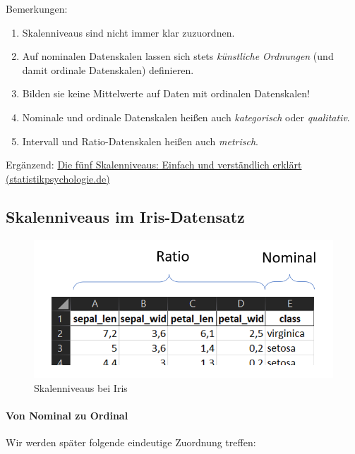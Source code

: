 \documentclass[
  oneside]{book}
\begin{document}
Bemerkungen:

\begin{enumerate}
\def\labelenumi{\arabic{enumi}.}
\item
  Skalenniveaus sind nicht immer klar zuzuordnen.
\item
  Auf nominalen Datenskalen lassen sich stets \emph{künstliche Ordnungen} (und damit ordinale Datenskalen) definieren.
\item
  Bilden sie keine Mittelwerte auf Daten mit ordinalen Datenskalen!
\item
  Nominale und ordinale Datenskalen heißen auch \emph{kategorisch} oder \emph{qualitativ}.
\item
  Intervall und Ratio-Datenskalen heißen auch \emph{metrisch}.
\end{enumerate}

Ergänzend: \href{https://www.statistikpsychologie.de/skalenniveaus/}{Die fünf Skalenniveaus: Einfach und verständlich erklärt (statistikpsychologie.de)}

\hypertarget{skalenniveaus-im-iris-datensatz}{%
\subsection{Skalenniveaus im Iris-Datensatz}\label{skalenniveaus-im-iris-datensatz}}

\begin{figure}
\centering
\includegraphics{assets/daten.assets/image-20211209145313372.png}
\caption{Skalenniveaus bei Iris}
\end{figure}

\hypertarget{von-nominal-zu-ordinal}{%
\paragraph{Von Nominal zu Ordinal}\label{von-nominal-zu-ordinal}}

Wir werden später folgende eindeutige Zuordnung treffen:
\end{document}
